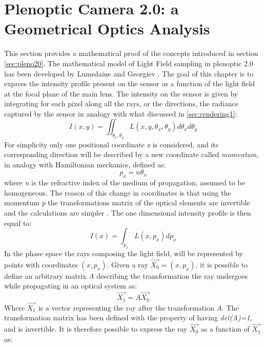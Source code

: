   \section{Plenoptic Camera 2.0: a Geometrical Optics Analysis}
  \label{sec:phase2.0}
  This section provides a mathematical proof of the concepts introduced in section \ref{sec:pleno20}. The mathematical model of Light Field sampling in plenoptic 2.0 has been developed by Lumsdaine and Georgiev \cite{lumsdaine2009focused,lumsdaine2008full}. The goal of this chapter is to express the intensity profile present on the sensor as a function of the light field at the focal plane of the main lens. The intensity on the sensor is given by integrating for each pixel along all the rays, or the directions, the radiance captured by the sensor in analogy with what discussed in \ref{sec:rendering1}:
  \begin{equation}
 	\label{eq:phase201}
 	I(x,y)=\iint_{\theta_x, \theta_y}L(x,y,\theta_x,\theta_y) d\theta_xd\theta_y
  \end{equation} 
  For simplicity only one positional coordinate \textit{x} is considered, and its corresponding direction will be described by a new coordinate called \textit{momentum}, in analogy with Hamiltonian mechanics, defined as:
  \begin{equation}
	\label{eq:momentum2}
	p_x = n\theta_x
  \end{equation}
  where \textit{n} is the refractive index of the medium of propagation, assumed to be homogeneous. The reason of this change in coordinates is that using the momentum \textit{p} the transformations matrix of the optical elements are invertible and the calculations are simpler \cite{guillemin1990symplectic}. The one dimensional intensity profile is then equal to:
  \begin{equation}
  \label{eq:1Dintensity}
  I(x)=\int_{p_x}L(x,p_x) dp_x
  \end{equation} 
  In the phase space the rays composing the light field, will be represented by points with coordinates $(x,p_x)$. Given a ray $\overrightarrow{X_0}=(x,p_x)$, it is possible to define an arbitrary matrix \textit{A} describing the transformation the ray undergoes while propagating in an optical system as:
  \begin{equation}
  \label{eq:transmatrix1}
  \overrightarrow{X_1}=A\overrightarrow{X_0}
  \end{equation}
  Where $\overrightarrow{X_1}$ is a vector representing the ray after the transformation \textit{A}. The transformation matrix has been defined with the property of having \textit{det(A)=1}, and is invertible. It is therefore possible to express the ray $\overrightarrow{X_0}$ as a function of $\overrightarrow{X_1}$ as:
